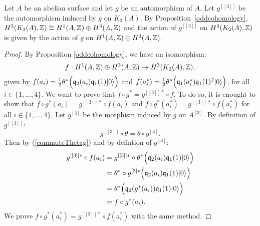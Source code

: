 \begin{cor}\label{actionH3}
Let $A$ be an abelian surface and let $g$ be an automorphism of $A$. Let $g^{[[3]]}$ be the automorphism induced by $g$ on $K_2(A)$.
By Proposition~\ref{oddcohomology}, $H^3(K_2(A),\mathbb{Z})\cong H^1(A,\mathbb{Z})\oplus H^3(A,\mathbb{Z})$ and the action of $g^{[[3]]}$ on $H^3(K_2(A),\mathbb{Z})$ is given by the action of $g$ on $H^1(A,\mathbb{Z})\oplus H^3(A,\mathbb{Z})$.
\end{cor}
\begin{proof}
By Proposition \ref{oddcohomology}, we have an isomorphism:
$$f:H^1(A,\mathbb{Z})\oplus H^3(A,\mathbb{Z})\rightarrow H^3(K_2(A),\mathbb{Z}),$$
given by $f(a_i)=\frac{1}{2}\theta^*\Big(\mathfrak{q}_2(a_i)\mathfrak{q}_1(1)|0\rangle\Big)$ and $f(a_i^*)=\frac{1}{2}\theta^*\Big( \mathfrak{q}_1(a^*_i)\mathfrak{q}_1(1)^2|0\rangle \Big)$, for all $i\in\{1,...,4\}$.
We want to prove that $f\circ g^*=g^{[[3]]*}\circ f$. 
To do so, it is enought to show that $f\circ g^*(a_i)=g^{[[3]]*}\circ f(a_i)$ and $f\circ g^*(a_i^*)=g^{[[3]]*}\circ f(a_i^*)$ for all $i\in\{1,...,4\}$.
Let $g^{[3]}$ be the morphism induced by $g$ on $A^{[3]}$. By definition of $g^{[[3]]}$:
\begin{equation}
g^{[[3]]}\circ \theta=\theta\circ g^{[3]}.
\label{commuteThetag}
\end{equation}
Then by (\ref{commuteThetag}) and by defintion of $g^{[3]}$:
\begin{align*}
 g^{[[3]]*}\circ f(a_i)&=g^{[[3]]*}\circ\theta^*\Big(\mathfrak{q}_2(a_i)\mathfrak{q}_1(1)|0\rangle\Big)\\
 &=\theta^*\circ g^{[3]*}\Big(\mathfrak{q}_2(a_i)\mathfrak{q}_1(1)|0\rangle\Big)\\
 &=\theta^*\Big(\mathfrak{q}_2(g^*(a_i))\mathfrak{q}_1(1)|0\rangle\Big)\\
 &=f\circ g^*(a_i).
\end{align*}
We prove $f\circ g^*(a_i^*)=g^{[[3]]*}\circ f(a_i^*)$ with the same method.


\end{proof}

